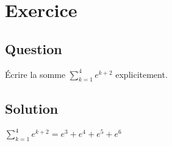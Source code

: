 \documentclass{article}
\begin{document}
\section{Exercice}

\subsection*{Question}
Écrire la somme $ \displaystyle{\sum_{k= 1 }^{ 4 }} e^{k + 2} $ explicitement.

\subsection*{Solution}
$ \displaystyle{\sum_{k= 1 }^{ 4 }} e^{k + 2} = e^3 + e^4 + e^5 + e^6 $
\end{document}
